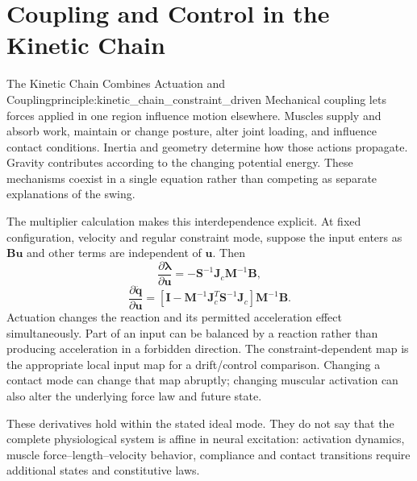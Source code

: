 \section{Coupling and Control in the Kinetic Chain}
\label{sec:why_constraints_dominate}

\begin{principle}{The Kinetic Chain Combines Actuation and Coupling}{principle:kinetic_chain_constraint_driven}
Mechanical coupling lets forces applied in one region influence motion elsewhere. Muscles supply and absorb work, maintain or change posture, alter joint loading, and influence contact conditions. Inertia and geometry determine how those actions propagate. Gravity contributes according to the changing potential energy. These mechanisms coexist in a single equation rather than competing as separate explanations of the swing.

The multiplier calculation makes this interdependence explicit. At fixed configuration, velocity and regular constraint mode, suppose the input enters as $\bm B\bm u$ and other terms are independent of $\bm u$. Then
\[
\frac{\partial\bm\lambda}{\partial\bm u}
=-\bm S^{-1}\bm J_c\bm M^{-1}\bm B,
\]
\[
\frac{\partial\ddot{\bm q}}{\partial\bm u}
=\left[\bm I-\bm M^{-1}\bm J_c^T\bm S^{-1}\bm J_c\right]\bm M^{-1}\bm B.
\]
Actuation changes the reaction and its permitted acceleration effect simultaneously. Part of an input can be balanced by a reaction rather than producing acceleration in a forbidden direction. The constraint-dependent map is the appropriate local input map for a drift/control comparison. Changing a contact mode can change that map abruptly; changing muscular activation can also alter the underlying force law and future state.

These derivatives hold within the stated ideal mode. They do not say that the complete physiological system is affine in neural excitation: activation dynamics, muscle force--length--velocity behavior, compliance and contact transitions require additional states and constitutive laws.
\end{principle}

